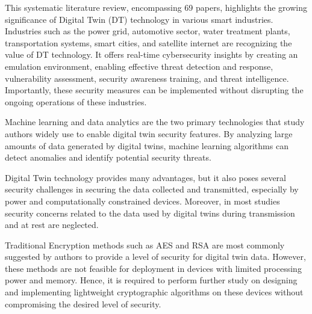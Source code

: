 This systematic literature review, encompassing 69 papers, highlights the growing significance of Digital Twin (DT) technology in various smart industries. Industries such as the power grid, automotive sector, water treatment plants, transportation systems, smart cities, and satellite internet are recognizing the value of DT technology. It offers real-time cybersecurity insights by creating an emulation environment, enabling effective threat detection and response, vulnerability assessment, security awareness training, and threat intelligence. Importantly, these security measures can be implemented without disrupting the ongoing operations of these industries.

Machine learning and data analytics are the two primary technologies that study authors widely use to enable digital twin security features. By analyzing large amounts of data generated by digital twins, machine learning algorithms can detect anomalies and identify potential security threats.

Digital Twin technology provides many advantages, but it also poses several security challenges in securing the data collected and transmitted, especially by power and computationally constrained devices. Moreover, in most studies security concerns related to the data used by digital twins during transmission and at rest are neglected.

Traditional Encryption methods such as AES and RSA are most commonly suggested by authors to provide a level of security for digital twin data. However, these methods are not feasible for deployment in devices with limited processing power and memory. Hence, it is required to perform further study on designing and implementing lightweight cryptographic algorithms on these devices without compromising the desired level of security. 



